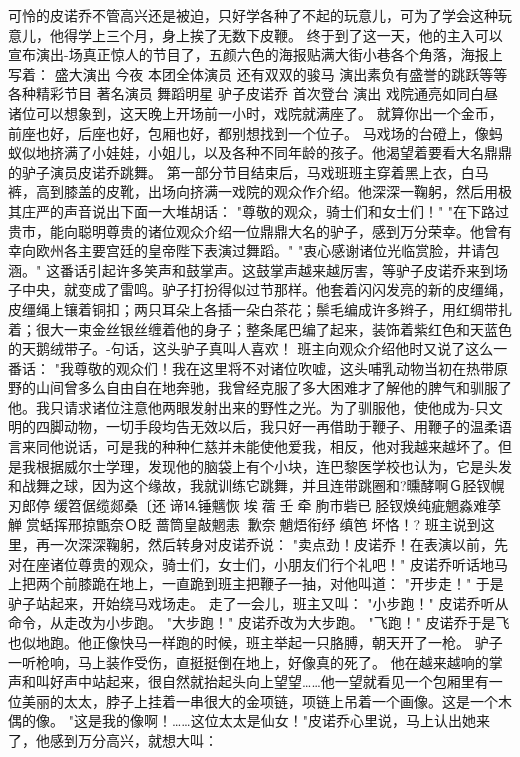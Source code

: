 \documentclass[12pt,UTF8]{ctexbook}
\begin{document}
可怜的皮诺乔不管高兴还是被迫，只好学各种了不起的玩意儿，可为了学会这种玩意儿，他得学上三个月，身上挨了无数下皮鞭。
终于到了这一天，他的主入可以宣布演出-场真正惊人的节目了，五颜六色的海报贴满大街小巷各个角落，海报上写着：
盛大演出
今夜
本团全体演员
还有双双的骏马
演出素负有盛誉的跳跃等等
各种精彩节目
著名演员
舞蹈明星
驴子皮诺乔
首次登台
演出
戏院通亮如同白昼
诸位可以想象到，这天晚上开场前一小时，戏院就满座了。
就算你出一个金币，前座也好，后座也好，包厢也好，都别想找到一个位子。
马戏场的台磴上，像蚂蚁似地挤满了小娃娃，小姐儿，以及各种不同年龄的孩子。他渴望着要看大名鼎鼎的驴子演员皮诺乔跳舞。
第一部分节目结束后，马戏班班主穿着黑上衣，白马裤，高到膝盖的皮靴，出场向挤满一戏院的观众作介绍。他深深一鞠躬，然后用极其庄严的声音说出下面一大堆胡话：
"尊敬的观众，骑士们和女士们！"
"在下路过贵市，能向聪明尊贵的诸位观众介绍一位鼎鼎大名的驴子，感到万分荣幸。他曾有幸向欧州各主要宫廷的皇帝陛下表演过舞蹈。"
"衷心感谢诸位光临赏脸，井请包涵。"
这番话引起许多笑声和鼓掌声。这鼓掌声越来越厉害，等驴子皮诺乔来到场子中央，就变成了雷鸣。驴子打扮得似过节那样。他套着闪闪发亮的新的皮缰绳，皮缰绳上镶着铜扣；两只耳朵上各插一朵白茶花；鬃毛编成许多辫子，用红绸带扎着；很大一束金丝银丝缠着他的身子；整条尾巴编了起来，装饰着紫红色和天蓝色的天鹅绒带子。-句话，这头驴子真叫人喜欢！
班主向观众介绍他时又说了这么一番话：
"我尊敬的观众们！我在这里将不对诸位吹嘘，这头哺乳动物当初在热带原野的山间曾多么自由自在地奔驰，我曾经克服了多大困难才了解他的脾气和驯服了他。我只请求诸位注意他两眼发射出来的野性之光。为了驯服他，使他成为-只文明的四脚动物，一切手段均告无效以后，我只好一再借助于鞭子、用鞭子的温柔语言来同他说话，可是我的种种仁慈并未能使他爱我，相反，他对我越来越坏了。但是我根据威尔士学理，发现他的脑袋上有个小块，连巴黎医学校也认为，它是头发和战舞之球，因为这个缘故，我就训练它跳舞，并且连带跳圈和?曛酵啊Ｇ胫钗幌刃郎停缓笤倨缆郯桑〔还谛⒕锤魑恢埃蓿壬牵朐市砦已胫钗焕纯疵魍淼难莩觯赏蛞挥邢掠甑奈Ｏ眨蔷筒皇敲魍恚歉奈魈焐衔纾缜笆坏恪！?
班主说到这里，再一次深深鞠躬，然后转身对皮诺乔说：
"卖点劲！皮诺乔！在表演以前，先对在座诸位尊贵的观众，骑士们，女士们，小朋友们行个礼吧！"
皮诺乔听话地马上把两个前膝跪在地上，一直跪到班主把鞭子一抽，对他叫道：
"开步走！"
于是驴子站起来，开始绕马戏场走。
走了一会儿，班主又叫：
"小步跑！"
皮诺乔听从命令，从走改为小步跑。
"大步跑！"
皮诺乔改为大步跑。
"飞跑！"
皮诺乔于是飞也似地跑。他正像快马一样跑的时候，班主举起一只胳膊，朝天开了一枪。
驴子一听枪响，马上装作受伤，直挺挺倒在地上，好像真的死了。
他在越来越响的掌声和叫好声中站起来，很自然就抬起头向上望望……他一望就看见一个包厢里有一位美丽的太太，脖子上挂着一串很大的金项链，项链上吊着一个画像。这是一个木偶的像。
"这是我的像啊！……这位太太是仙女！"皮诺乔心里说，马上认出她来了，他感到万分高兴，就想大叫：
\end{document}
